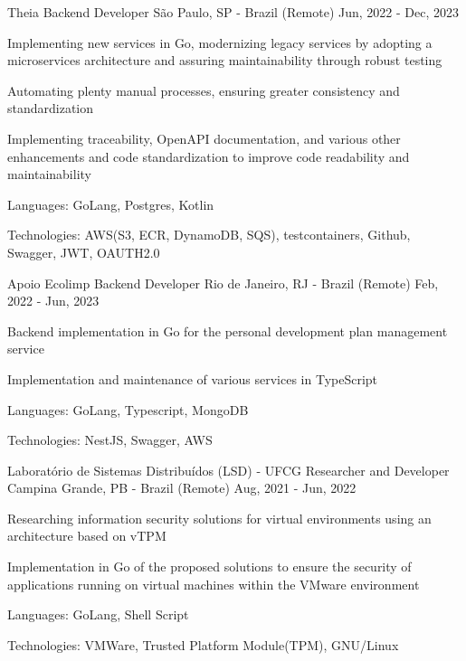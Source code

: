 
\begin{cventries}
  \cventry
  {Theia} %
  {Backend Developer} %
  {São Paulo, SP - Brazil (Remote)} %
  {Jun, 2022 - Dec, 2023} %
  {
    \begin{cvitems} %
      \item {Implementing new services in Go, modernizing legacy services by adopting a microservices architecture and assuring maintainability through robust testing}
      \item {Automating plenty manual processes, ensuring greater consistency and standardization}
      \item {Implementing traceability, OpenAPI documentation, and various other enhancements and code standardization to improve code readability and maintainability}
      \item {Languages: GoLang, Postgres, Kotlin}
      \item {Technologies: AWS(S3, ECR, DynamoDB, SQS), testcontainers, Github, Swagger, JWT, OAUTH2.0}
    \end{cvitems}
  }

  \cventry
  {Apoio Ecolimp} %
  {Backend Developer} %
  {Rio de Janeiro, RJ - Brazil (Remote)} %
  {Feb, 2022 - Jun, 2023} %
  {
    \begin{cvitems} %
      \item {Backend implementation in Go for the personal development plan management service}
      \item {Implementation and maintenance of various services in TypeScript}
      \item {Languages: GoLang, Typescript, MongoDB}
      \item {Technologies: NestJS, Swagger, AWS}
    \end{cvitems}
  }

  \cventry
  {Laboratório de Sistemas Distribuídos (LSD) - UFCG} %
  {Researcher and Developer} %
  {Campina Grande, PB - Brazil (Remote)} %
  {Aug, 2021 - Jun, 2022} %
  {
    \begin{cvitems} %
      \item {Researching information security solutions for virtual environments using an architecture based on vTPM}
      \item {Implementation in Go of the proposed solutions to ensure the security of applications running on virtual machines within the VMware environment}
      \item {Languages: GoLang, Shell Script}
      \item {Technologies: VMWare, Trusted Platform Module(TPM), GNU/Linux}
    \end{cvitems}
  }


\end{cventries}
